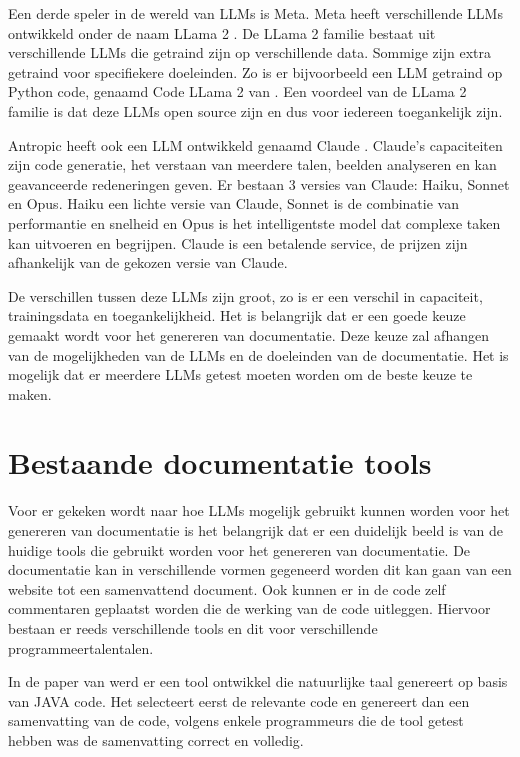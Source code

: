 Een derde speler in de wereld van LLMs is Meta. Meta heeft verschillende LLMs ontwikkeld onder de naam LLama 2 \autocite{Meta2024}.
De LLama 2 familie bestaat uit verschillende LLMs die getraind zijn op verschillende data. Sommige zijn extra getraind voor specifiekere doeleinden.
Zo is er bijvoorbeeld een LLM getraind op Python code, genaamd Code LLama 2 van \textcite{Roziere2024}.
Een voordeel van de LLama 2 familie is dat deze LLMs open source zijn en dus voor iedereen toegankelijk zijn.

Antropic heeft ook een LLM ontwikkeld genaamd Claude \autocite{Anthropic2023}. 
Claude's capaciteiten zijn code generatie, het verstaan van meerdere talen, beelden analyseren en kan geavanceerde redeneringen geven.
Er bestaan 3 versies van Claude: Haiku, Sonnet en Opus.
Haiku een lichte versie van Claude, Sonnet is de combinatie van performantie en snelheid en Opus is het intelligentste model dat complexe taken kan uitvoeren en begrijpen.
Claude is een betalende service, de prijzen zijn afhankelijk van de gekozen versie van Claude.

De verschillen tussen deze LLMs zijn groot, zo is er een verschil in capaciteit, trainingsdata en toegankelijkheid.
Het is belangrijk dat er een goede keuze gemaakt wordt voor het genereren van documentatie.
Deze keuze zal afhangen van de mogelijkheden van de LLMs en de doeleinden van de documentatie.
Het is mogelijk dat er meerdere LLMs getest moeten worden om de beste keuze te maken.

\section{Bestaande documentatie tools}
\label{sec:huidige-tools}
Voor er gekeken wordt naar hoe LLMs mogelijk gebruikt kunnen worden voor het genereren van documentatie is het belangrijk dat er een duidelijk beeld is van de huidige tools die gebruikt worden voor het genereren van documentatie.
De documentatie kan in verschillende vormen gegeneerd worden dit kan gaan van een website tot een samenvattend document.
Ook kunnen er in de code zelf commentaren geplaatst worden die de werking van de code uitleggen.
Hiervoor bestaan er reeds verschillende tools en dit voor verschillende programmeertalentalen.

In de paper van \textcite{SridharaEtAL2010} werd er een tool ontwikkel die natuurlijke taal genereert op basis van JAVA code. 
Het selecteert eerst de relevante code en genereert dan een samenvatting van de code, volgens enkele programmeurs die de tool getest hebben was de samenvatting correct en volledig.

